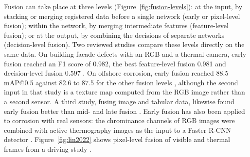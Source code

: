 Fusion can take place at three levels (Figure~\ref{fig:fusion-levels}): at the input, by stacking or merging registered data before
a single network (early or pixel-level fusion); within the network, by merging
intermediate features (feature-level fusion); or at the output, by combining the
decisions of separate networks (decision-level fusion). Two reviewed studies
compare these levels directly on the same data. On building facade defects with
an RGB and a thermal camera, early fusion reached an F1 score of 0.982, the best
feature-level fusion 0.981 and decision-level fusion 0.597 \citep{Yang2023}. On offshore
corrosion, early fusion reached 88.5 mAP@0.5 against 82.6 to 87.5 for the other
fusion levels \citep{Mao2026}, although the second input in that study is a texture map
computed from the RGB image rather than a second sensor. A third study, fusing
image and tabular data, likewise found early fusion better than mid- and late
fusion \citep{Chowdhury2026}. Early fusion has also been applied to corrosion with real sensors:
the chrominance channels of RGB images were combined with active thermography
images as the input to a Faster R-CNN detector \citep{Lim2021}. Figure~\ref{fig:lin2022} shows pixel-level fusion of visible
and thermal frames from a driving study \citep{Lin2022}.



